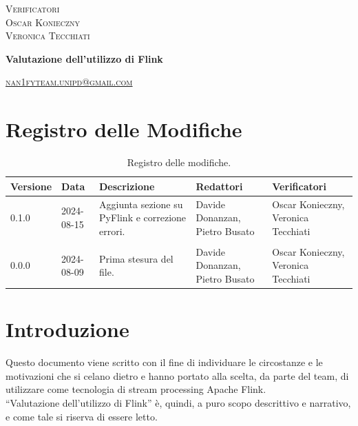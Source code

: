 \documentclass[8pt]{article}
\begin{document}
\begin{titlepage}
\begin{minipage}[t]{0.47\textwidth}
{		}
		\vspace{8mm}
		
		{\large{\textsc{Verificatori}}
			\vspace{3mm}
			{\\\large{\textsc{Oscar Konieczny}\\}}  %
			{\large{\textsc{Veronica Tecchiati}}}
			
		}
		\vspace{4mm}\vspace{4mm}
	\end{minipage}
	\vspace{4cm}
	\begin{center}
		\begin{flushright}
			{\fontsize{30pt}{52pt}\selectfont \textbf{Valutazione dell'utilizzo di Flink\\}} %
		\end{flushright}
		\vspace{3cm}
	\end{center}
	\vspace{9.5cm}
	{\small \textsc{\href{mailto: nan1fyteam.unipd@gmail.com}{nan1fyteam.unipd@gmail.com}}}
\end{titlepage}
\pagestyle{mystyle}
\section*{Registro delle Modifiche}
\begin{table}[ht!]
\hypersetup{hidelinks}
	\centering
	\begin{tabular}{p{1.2cm} p{2cm} p{4cm} p{4cm} p{3cm}}
		\toprule
		\textbf{Versione} & \textbf{Data} & \textbf{Descrizione} & \textbf{Redattori} & \textbf{Verificatori} \\
		\midrule
			0.1.0 & 2024-08-15 & Aggiunta sezione su PyFlink e correzione errori. & Davide Donanzan, Pietro Busato & Oscar Konieczny, Veronica Tecchiati \\\\
            0.0.0 & 2024-08-09 & Prima stesura del file. & Davide Donanzan, Pietro Busato & Oscar Konieczny, Veronica Tecchiati \\
		\bottomrule
	\end{tabular}
	\caption{Registro delle modifiche.}\label{table:Registro delle modifiche}
\end{table}
\newpage
\tableofcontents
\clearpage
\newpage
\justifying
\section{Introduzione}
Questo documento viene scritto con il fine di individuare le circostanze e le motivazioni che si celano dietro e hanno portato alla scelta, da parte del team, di utilizzare come tecnologia di stream processing Apache Flink.\\
``Valutazione dell'utilizzo di Flink'' è, quindi, a puro scopo descrittivo e narrativo, e come tale si riserva di essere letto.
\end{document}
